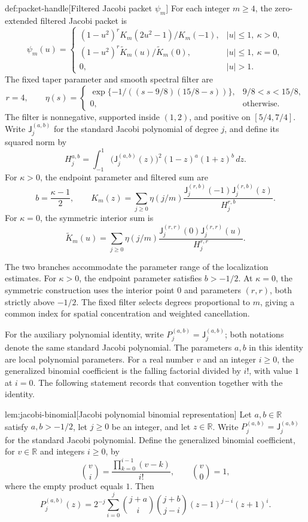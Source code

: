 \documentclass[11pt]{article}
\begin{document}
\begin{definitionv}{def:packet-handle}[Filtered Jacobi packet \(\psi_m\)]
For each integer \(m\ge4\), the zero-extended filtered Jacobi packet is
\[
\psi_m(u)=
\begin{cases}
(1-u^2)^r K_m(2u^2-1)/K_m(-1),
& |u|\le1,\ \kappa>0,\\
(1-u^2)^r\widetilde K_m(u)/\widetilde K_m(0),
& |u|\le1,\ \kappa=0,\\
0,& |u|>1.
\end{cases}
\]
The fixed taper parameter and smooth spectral filter are
\[
r=4,\qquad
\eta(s)=
\begin{cases}
\exp\{-1/((s-9/8)(15/8-s))\},
& 9/8<s<15/8,\\
0,& \text{otherwise}.
\end{cases}
\]
The filter is nonnegative, supported inside \((1,2)\), and positive on \([5/4,7/4]\). Write \(\mathsf J_j^{(a,b)}\) for the standard Jacobi polynomial of degree \(j\), and define its squared norm by
\[
H_j^{a,b}
=
\int_{-1}^{1}
\bigl(\mathsf J_j^{(a,b)}(z)\bigr)^2
(1-z)^a(1+z)^b\,dz.
\]
For \(\kappa>0\), the endpoint parameter and filtered sum are
\[
b=\frac{\kappa-1}{2},\qquad
K_m(z)=\sum_{j\ge0}\eta(j/m)
\frac{\mathsf J_j^{(r,b)}(-1)\mathsf J_j^{(r,b)}(z)}
{H_j^{r,b}}.
\]
For \(\kappa=0\), the symmetric interior sum is
\[
\widetilde K_m(u)=\sum_{j\ge0}\eta(j/m)
\frac{\mathsf J_j^{(r,r)}(0)\mathsf J_j^{(r,r)}(u)}
{H_j^{r,r}}.
\]
\end{definitionv}

The two branches accommodate the parameter range of the localization estimates. For \(\kappa>0\), the endpoint parameter satisfies \(b>-1/2\). At \(\kappa=0\), the symmetric construction uses the interior point \(0\) and parameters \((r,r)\), both strictly above \(-1/2\). The fixed filter selects degrees proportional to \(m\), giving a common index for spatial concentration and weighted cancellation.

For the auxiliary polynomial identity, write \(P_j^{(a,b)}=\mathsf J_j^{(a,b)}\); both notations denote the same standard Jacobi polynomial. The parameters \(a,b\) in this identity are local polynomial parameters. For a real number \(v\) and an integer \(i\ge0\), the generalized binomial coefficient is the falling factorial divided by \(i!\), with value \(1\) at \(i=0\). The following statement records that convention together with the identity.

\begin{lemmav}{lem:jacobi-binomial}[Jacobi polynomial binomial representation]
Let \(a,b\in\mathbb R\) satisfy \(a,b>-1/2\), let \(j\ge0\) be an integer, and let \(z\in\mathbb R\). Write \(P_j^{(a,b)}=\mathsf J_j^{(a,b)}\) for the standard Jacobi polynomial. Define the generalized binomial coefficient, for \(v\in\mathbb R\) and integers \(i\ge0\), by
\[
\binom{v}{i}=\frac{\prod_{k=0}^{i-1}(v-k)}{i!},
\qquad \binom{v}{0}=1,
\]
where the empty product equals \(1\). Then
\[
P_j^{(a,b)}(z)
=2^{-j}\sum_{i=0}^{j}
\binom{j+a}{i}\binom{j+b}{j-i}
(z-1)^{j-i}(z+1)^i.
\]
\end{lemmav}
\end{document}
